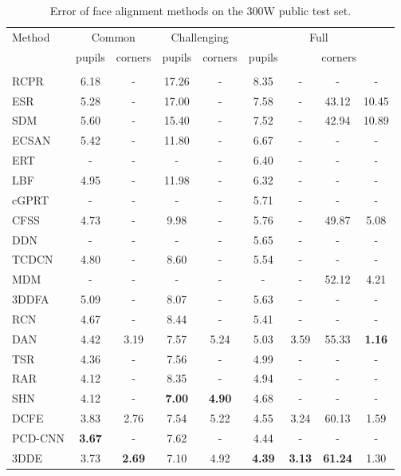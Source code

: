 \documentclass[11pt,twocolumn]{article}
\begin{document}
\begin{table*}
\begin{center}
\footnotesize
\setlength\tabcolsep{0.25pt}
\begin{tabular}{l|c|c|c|c|c|ccc}
\hline
\multirow{3}{*}{Method} & \multicolumn{2}{c|}{Common} & \multicolumn{2}{c|}{Challenging} & \multicolumn{4}{c}{Full}\\
 & pupils & corners & pupils & corners & pupils & \multicolumn{3}{c}{corners}\\
 &  &  &  &  &  &  &  & \\
\hline
RCPR \citep{Burgos13} & 6.18 & - & 17.26 & - & 8.35 & - & - & -\\
ESR \citep{Cao12} & 5.28 & - & 17.00 & - & 7.58 & - & 43.12 & 10.45\\
SDM \citep{Xiong13} & 5.60 & - & 15.40 & - & 7.52 & - & 42.94 & 10.89\\
ECSAN \citep{Zhang18b} & 5.42 & - & 11.80 & - & 6.67 & - & - & -\\
ERT \citep{Kazemi14} & - & - & - & - & 6.40 & - & - & -\\
LBF \citep{Ren16} & 4.95 & - & 11.98 & - & 6.32 & - & - & -\\
cGPRT \citep{Lee15b} & - & - & - & - & 5.71 & - & - & -\\
CFSS \citep{Zhu15} & 4.73 & - & 9.98 & - & 5.76 & - & 49.87 & 5.08\\
DDN \citep{Yu16} & - & - & - & - & 5.65 & - & - & -\\
TCDCN \citep{Zhang14b} & 4.80 & - & 8.60 & - & 5.54 & - & - & -\\
MDM \citep{Trigeorgis16} & - & - & - & - & - & - & 52.12 & 4.21\\
3DDFA \citep{Zhu17} & 5.09 & - & 8.07 & - & 5.63 & - & - & -\\
RCN \citep{Honari16} & 4.67 & - & 8.44 & - & 5.41 & - & - & -\\
DAN \citep{Kowalski17} & 4.42 & 3.19 & 7.57 & 5.24 & 5.03 & 3.59 & 55.33 & \textbf{1.16}\\
TSR \citep{Lv17} & 4.36 & - & 7.56 & - & 4.99 & - & - & -\\
RAR \citep{Xiao16} & 4.12 & - & 8.35 & - & 4.94 & - & - & -\\
SHN \citep{Yang17} & 4.12 & - & \textbf{7.00} & \textbf{4.90} & 4.68 & - & - & -\\
DCFE \citep{Valle18} & 3.83 & 2.76 & 7.54 & 5.22 & 4.55 & 3.24 & 60.13 & 1.59\\
PCD-CNN \citep{Kumar18a} & \textbf{3.67} & - & 7.62 & - & 4.44 & - & - & -\\
\hline
3DDE & 3.73 & \textbf{2.69} & 7.10 & 4.92 & \textbf{4.39} & \textbf{3.13} & \textbf{61.24} & 1.30\\
\hline
\end{tabular}
\end{center}
\caption{Error of face alignment methods on the 300W public test set.}
\label{table:300w_public}
\end{table*}
\end{document}
